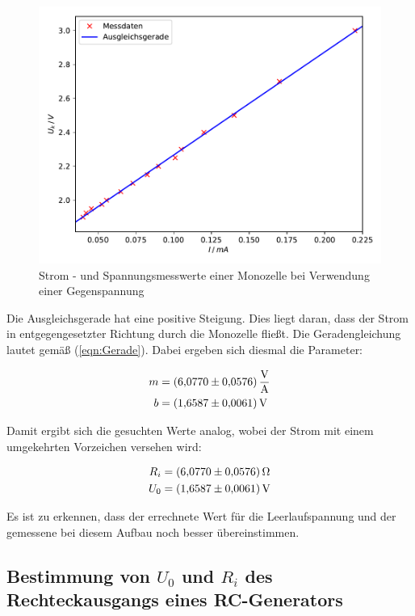 \begin{figure}
  \centering
  \includegraphics[scale=0.75]{content/plot2.pdf}
  \caption{Strom - und Spannungsmesswerte einer Monozelle bei Verwendung einer Gegenspannung}
  \label{fig:plot2}
\end{figure}

Die Ausgleichsgerade hat eine positive Steigung. Dies liegt daran, dass 
der Strom in entgegengesetzter Richtung durch die Monozelle fließt. 
Die Geradengleichung lautet gemäß (\ref{eqn:Gerade}). Dabei ergeben sich diesmal 
die Parameter: 

\begin{align*}
m &= \SI{6.0770+-0.0576}{\volt\per\ampere}\\
b &= \SI{1.6587+-0.0061}{\volt}
\end{align*}

Damit ergibt sich die gesuchten Werte analog, wobei der Strom mit
einem umgekehrten Vorzeichen versehen wird:

\begin{align*}
R_i &= \SI{6.0770+-0.0576}{\ohm}\\
U_0 &= \SI{1.6587+-0.0061}{\volt}
\end{align*}

Es ist zu erkennen, dass der errechnete Wert für die Leerlaufspannung
und der gemessene bei diesem Aufbau noch besser übereinstimmen.

\subsection{Bestimmung von $U_0$ und $R_i$ des Rechteckausgangs
            eines RC-Generators}

